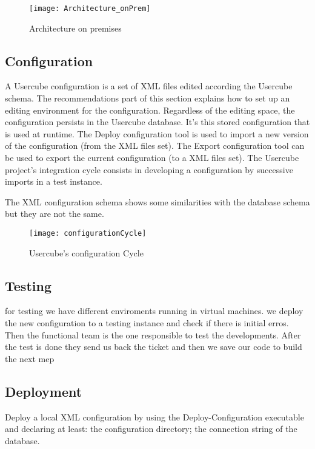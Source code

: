 \begin{figure}[htbp]
  \centering
  \texttt{[image: Architecture\_onPrem]}
  \caption{Architecture on premises}
  \label{fig:Architecture_onPrem}
\end{figure}

\subsection{Configuration}


A Usercube configuration is a set of XML files edited according the Usercube schema. The recommendations part of this section explains how to set up an editing environment for the configuration. Regardless of the editing space, the configuration persists in the Usercube database. It's this stored configuration that is used at runtime. The Deploy configuration tool is used to import a new version of the configuration (from the XML files set). The Export configuration tool can be used to export the current configuration (to a XML files set). The Usercube project's integration cycle consists in developing a configuration by successive imports in a test instance.

The XML configuration schema shows some similarities with the database schema but they are not the same.

\begin{figure}[htbp]
  \centering
  \texttt{[image: configurationCycle]}
  \caption{Usercube's configuration Cycle}
  \label{fig:configurationCycle}
\end{figure}

\subsection{Testing}


for testing we have different enviroments running in virtual machines. we deploy the new configuration to a testing instance and check if there is initial erros. Then the functional team is the one responsible to test the developments. After the test is done they send us back the ticket and then we save our code to build the next mep

\subsection{Deployment}


Deploy a local XML configuration by using the Deploy-Configuration executable and declaring at least: the configuration directory; the connection string of the database.





